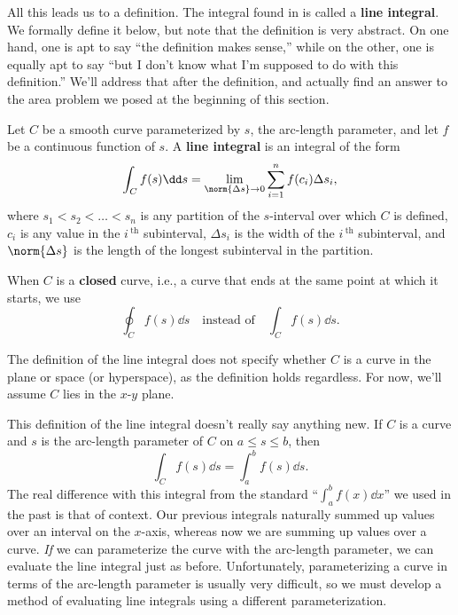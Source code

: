 All this leads us to a definition. The integral found in  is called a \textbf{line integral}. We formally define it below, but note that the definition is very abstract. On one hand, one is apt to say ``the definition makes sense,'' while on the other, one is equally apt to say ``but I don't know what I'm supposed to do with this definition.'' We'll address that after the definition, and actually find an answer to the area problem we posed at the beginning of this section.


\begin{definition}\label{def:line_integral1}%
Let $C$ be a smooth curve parameterized by $s$, the arc-length parameter, and let $f$ be a continuous function of $s$. A \textbf{line integral} is an integral of the form
\[\int_C f(s)\dd s = \lim_{\norm{\Delta s}\to 0}\sum_{i=1}^n f(c_i)\Delta s_i,\]
where $s_1<s_2<\dots<s_n$ is any partition of the $s$-interval over which $C$ is defined, $c_i$ is any value in the $i\,^\text{th}$ subinterval,  $\Delta s_i$ is the width of the $i\,^\text{th}$ subinterval, and $\norm{\Delta s}$ is the length of the longest subinterval in the partition.
\end{definition}

When $C$ is a \textbf{closed} curve, i.e., a curve that ends at the same point at which it starts,  we use
\[\oint_C f(s)\dd s \quad \text{instead of}\quad \int_Cf(s)\dd s.\]

The definition of the line integral does not specify whether $C$ is a curve in the plane or space (or hyperspace), as the definition holds regardless. For now, we'll assume $C$ lies in the $x$-$y$ plane.

This definition of the line integral  doesn't really say anything new. If $C$ is a curve and $s$ is the arc-length parameter of $C$ on $a\leq s\leq b$, then 
\[\int_Cf(s)\dd s = \int_a^bf(s)\dd s.\]
The real difference with this integral from the standard ``$\int_a^bf(x)\dd x$'' we used in the past is that of context. Our previous integrals naturally summed up values over an interval on the $x$-axis, whereas now we are summing up values over a curve. \emph{If} we can parameterize the curve with the arc-length parameter, we can evaluate the line integral just as before. Unfortunately, parameterizing a curve in terms of the arc-length parameter is usually very difficult, so we must develop a method of evaluating line integrals using a different parameterization.


